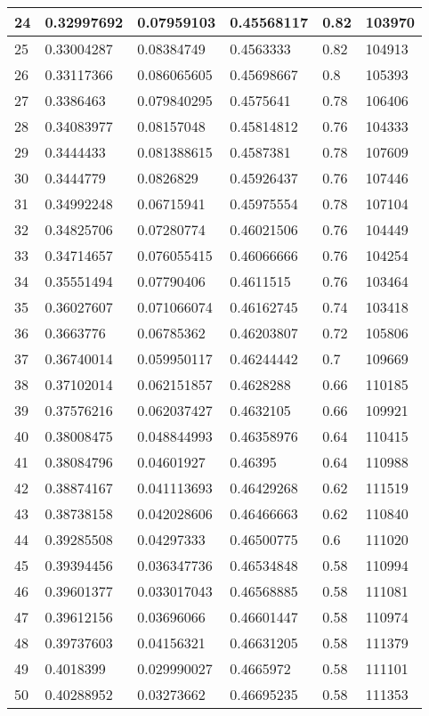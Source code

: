 \begin{longtable}{|l|l|l|l|l|l|}
24 & 0.32997692 & 0.07959103 & 0.45568117 & 0.82 & 103970 \\ \hline 
25 & 0.33004287 & 0.08384749 & 0.4563333 & 0.82 & 104913 \\ \hline 
26 & 0.33117366 & 0.086065605 & 0.45698667 & 0.8 & 105393 \\ \hline 
27 & 0.3386463 & 0.079840295 & 0.4575641 & 0.78 & 106406 \\ \hline 
28 & 0.34083977 & 0.08157048 & 0.45814812 & 0.76 & 104333 \\ \hline 
29 & 0.3444433 & 0.081388615 & 0.4587381 & 0.78 & 107609 \\ \hline 
30 & 0.3444779 & 0.0826829 & 0.45926437 & 0.76 & 107446 \\ \hline 
31 & 0.34992248 & 0.06715941 & 0.45975554 & 0.78 & 107104 \\ \hline 
32 & 0.34825706 & 0.07280774 & 0.46021506 & 0.76 & 104449 \\ \hline 
33 & 0.34714657 & 0.076055415 & 0.46066666 & 0.76 & 104254 \\ \hline 
34 & 0.35551494 & 0.07790406 & 0.4611515 & 0.76 & 103464 \\ \hline 
35 & 0.36027607 & 0.071066074 & 0.46162745 & 0.74 & 103418 \\ \hline 
36 & 0.3663776 & 0.06785362 & 0.46203807 & 0.72 & 105806 \\ \hline 
37 & 0.36740014 & 0.059950117 & 0.46244442 & 0.7 & 109669 \\ \hline 
38 & 0.37102014 & 0.062151857 & 0.4628288 & 0.66 & 110185 \\ \hline 
39 & 0.37576216 & 0.062037427 & 0.4632105 & 0.66 & 109921 \\ \hline 
40 & 0.38008475 & 0.048844993 & 0.46358976 & 0.64 & 110415 \\ \hline 
41 & 0.38084796 & 0.04601927 & 0.46395 & 0.64 & 110988 \\ \hline 
42 & 0.38874167 & 0.041113693 & 0.46429268 & 0.62 & 111519 \\ \hline 
43 & 0.38738158 & 0.042028606 & 0.46466663 & 0.62 & 110840 \\ \hline 
44 & 0.39285508 & 0.04297333 & 0.46500775 & 0.6 & 111020 \\ \hline 
45 & 0.39394456 & 0.036347736 & 0.46534848 & 0.58 & 110994 \\ \hline 
46 & 0.39601377 & 0.033017043 & 0.46568885 & 0.58 & 111081 \\ \hline 
47 & 0.39612156 & 0.03696066 & 0.46601447 & 0.58 & 110974 \\ \hline 
48 & 0.39737603 & 0.04156321 & 0.46631205 & 0.58 & 111379 \\ \hline 
49 & 0.4018399 & 0.029990027 & 0.4665972 & 0.58 & 111101 \\ \hline 
50 & 0.40288952 & 0.03273662 & 0.46695235 & 0.58 & 111353 \\ \hline 
\end{longtable}